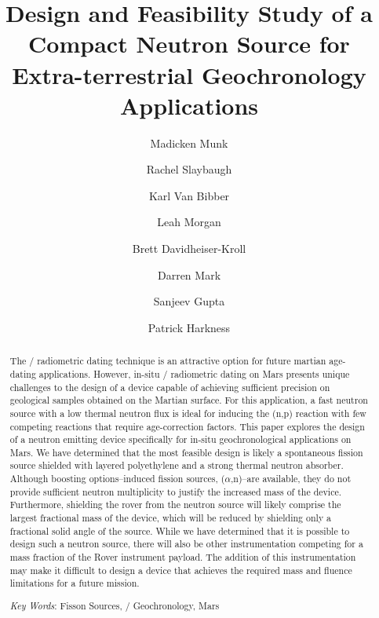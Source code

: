 \documentclass{mc2015}
\begin{document}
\title{Design and Feasibility Study of a Compact Neutron Source for Extra-terrestrial Geochronology Applications}

\author{Madicken Munk}
\author{Rachel Slaybaugh}
\author{Karl Van Bibber}

\author{Leah Morgan}
\author{Brett Davidheiser-Kroll}
\author{Darren Mark}
\author{Sanjeev Gupta}
\author{Patrick Harkness}

\maketitle

\begin{abstract}
The / radiometric dating technique is an attractive option for future martian age-dating applications. However, in-situ / radiometric dating on Mars presents unique challenges to the design of a device capable of achieving sufficient precision on geological samples obtained on the Martian surface. For this application, a fast neutron source with a low thermal neutron flux is ideal for inducing the (n,p) reaction with few competing reactions that require age-correction factors. This paper explores the design of a neutron emitting device specifically for in-situ geochronological applications on Mars. We have determined that the most feasible design is likely a  spontaneous fission source shielded with layered polyethylene and a strong thermal neutron absorber. Although boosting options--induced fission sources, ($\alpha$,n)--are available, they do not provide sufficient neutron multiplicity to justify the increased mass of the device. Furthermore, shielding the rover from the neutron source will likely comprise the largest fractional mass of the device, which will be reduced by shielding only a fractional solid angle of the source. While we have determined that it is possible to design such a neutron source, there will also be other instrumentation competing for a mass fraction of the Rover instrument payload. The addition of this instrumentation may make it difficult to design a device that achieves the required mass and fluence limitations for a future mission.   

\emph{Key Words}: Fisson Sources, / Geochronology, Mars
\end{abstract}
\end{document}
